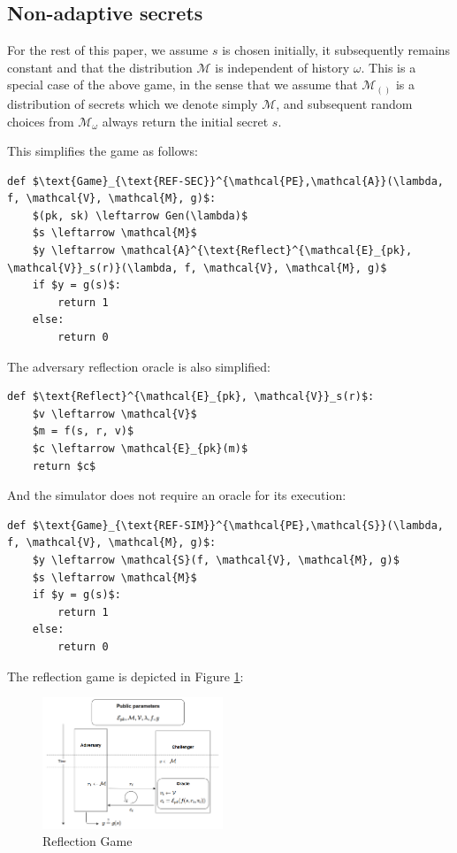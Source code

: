 \documentclass[conference, letterpaper, 10pt]{IEEEtran}
\begin{document}
\subsection{Non-adaptive secrets}\label{subsec:refsecnonadapt}

For the rest of this paper, we assume $s$ is chosen initially, it subsequently
remains constant and that the distribution $\mathcal{M}$ is independent of
history $\omega$. This is a special case of the above game, in the sense that we
assume that $\mathcal{M}_{()}$ is a distribution of secrets which we denote
simply $\mathcal{M}$, and subsequent random choices from $\mathcal{M}_\omega$
always return the initial secret $s$.

This simplifies the game as follows:

\begin{lstlisting}[texcl,mathescape,basicstyle=\small]
def $\text{Game}_{\text{REF-SEC}}^{\mathcal{PE},\mathcal{A}}(\lambda, f, \mathcal{V}, \mathcal{M}, g)$:
    $(pk, sk) \leftarrow Gen(\lambda)$
    $s \leftarrow \mathcal{M}$
    $y \leftarrow \mathcal{A}^{\text{Reflect}^{\mathcal{E}_{pk}, \mathcal{V}}_s(r)}(\lambda, f, \mathcal{V}, \mathcal{M}, g)$
    if $y = g(s)$:
        return 1
    else:
        return 0
\end{lstlisting}

The adversary reflection oracle is also simplified:

\begin{lstlisting}[texcl,mathescape,basicstyle=\small]
def $\text{Reflect}^{\mathcal{E}_{pk}, \mathcal{V}}_s(r)$:
    $v \leftarrow \mathcal{V}$
    $m = f(s, r, v)$
    $c \leftarrow \mathcal{E}_{pk}(m)$
    return $c$
\end{lstlisting}

And the simulator does not require an oracle for its execution:

\begin{lstlisting}[texcl,mathescape,basicstyle=\small]
def $\text{Game}_{\text{REF-SIM}}^{\mathcal{PE},\mathcal{S}}(\lambda, f, \mathcal{V}, \mathcal{M}, g)$:
    $y \leftarrow \mathcal{S}(f, \mathcal{V}, \mathcal{M}, g)$
    $s \leftarrow \mathcal{M}$
    if $y = g(s)$:
        return 1
    else:
        return 0
\end{lstlisting}

The reflection game is depicted in Figure \ref{fig:refgame}:

    \begin{figure}[thpb]
        \centering
            \includegraphics[width=0.48\textwidth]{reflection_game.png}
        \caption{Reflection Game}
        \label{fig:refgame}
    \end{figure}
\end{document}
